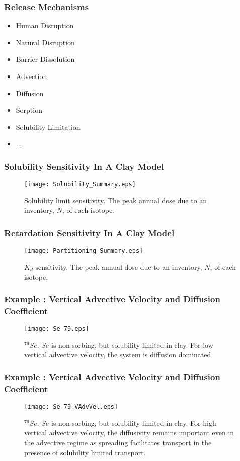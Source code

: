 
\begin{frame}
  \frametitle{Release Mechanisms}
  \begin{itemize} 
  \item Human Disruption
  \item Natural Disruption
  \item Barrier Dissolution
  \item Advection
  \item Diffusion
  \item Sorption
  \item Solubility Limitation
  \item ... 
  \end{itemize}
\end{frame}

\begin{frame}
\frametitle{Solubility Sensitivity In A Clay Model}
\begin{figure}[ht]
  \centering
  \texttt{[image: Solubility\_Summary.eps]}
  \caption{Solubility limit sensitivity. The peak annual dose due to an 
  inventory, $N$, of each isotope.}
  \label{fig:SolSum}
\end{figure}
\end{frame}

\begin{frame}[htb]
\frametitle{Retardation Sensitivity In A Clay Model}
\begin{figure}[ht]
  \centering
  \texttt{[image: Partitioning\_Summary.eps]}
  \caption{$K_d$ sensitivity.  The peak annual dose due to an inventory, 
  $N$, of each isotope.}
  \label{fig:KdSum}
\end{figure}
\end{frame}

\begin{frame}[c]
  \frametitle{Example : Vertical Advective Velocity and Diffusion Coefficient}
\begin{figure}[htp!]
\centering
\texttt{[image: Se-79.eps]}
\caption{$^{79}Se$.  $Se$ is non sorbing, but solubility limited in clay.  For low vertical advective velocity, the system is diffusion dominated.}
\label{fig:VAdvVelSe79}
\end{figure}
\end{frame}

\begin{frame}[c]
  \frametitle{Example : Vertical Advective Velocity and Diffusion Coefficient}
\begin{figure}[ht!]
\centering
\texttt{[image: Se-79-VAdvVel.eps]}
\caption{$^{79}Se$.
$Se$ is non sorbing, but solubility limited in clay.
For high vertical advective 
velocity, the diffusivity remains important even in the advective regime as 
spreading facilitates transport in the presence of solubility limited 
transport.} 
\label{fig:VAdvVelSe79VAdvVel}
\end{figure}
\end{frame}

